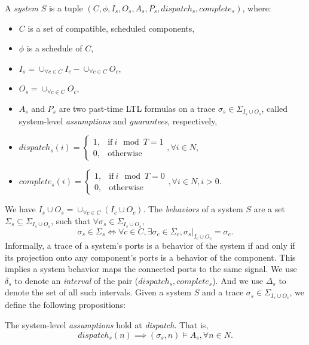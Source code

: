 A \emph{system} $S$ is a tuple $(C, \phi, I_s, O_s, A_s, P_s, dispatch_s, complete_s)$, where:
\begin{itemize}
	\item $C$ is a set of compatible, scheduled components,
	\item $\phi$ is a schedule of $C$,	
	\item $I_s = \cup_{\forall c \in C}I_c -  \cup_{\forall c \in C}O_c$,
	\item $O_s = \cup_{\forall c \in C}O_c$,
	\item $A_s$ and $P_s$ are two past-time LTL formulas on a trace $\sigma_s \in \Sigma_{I_s \cup O_s}$, called system-level \emph{assumptions} and \emph{guarantees}, respectively,
	\item $dispatch_s (i) = 
	    	\begin{cases}
      		1, & \text{if}\ i \mod T =1 \\
	     	0, & \text{otherwise}
   	 	\end{cases}, \forall i \in N$,
   	\item $complete_s (i) =
   		\begin{cases}
      		1, & \text{if}\ i \mod T = 0 \\
	     	0, & \text{otherwise}
   	 	\end{cases}, \forall i \in N, i > 0$.
\end{itemize}
We have $I_s  \cup O_s = \cup_{\forall c \in C}(I_c \cup O_c)$.
The \emph{behaviors} of a system $S$ are a set $\Sigma_s \subseteq \Sigma_{I_s \cup O_s}$, such that $\forall \sigma_s \in \Sigma_{I_s \cup O_s}$, 
\begin{equation}
	\sigma_s\in \Sigma_s  \iff \forall c \in C, \exists \sigma_c \in \Sigma_c, \sigma_s|_{I_c \cup O_c} = \sigma_c.
\end{equation}
Informally, a trace of a system's ports is a behavior of the system if and only if its projection onto any component's ports is a behavior of the component. 
This implies a system behavior maps the connected ports to the same signal.
We use $\delta_s$ to denote an \emph{interval} of the pair ($dispatch_s, complete_s$). And we use $\Delta_s$ to denote the set of all such intervals.
Given a system $S$ and a trace $\sigma_s \in \Sigma_{I_s \cup O_s}$, we define the following propositions:

\bigskip
The system-level \emph{assumptions} hold at \emph{dispatch}. That is,
\begin{equation} 
\label{eqn:sys_assumption}
	dispatch_s(n) \implies (\sigma_s, n) \models A_s, \forall n\in N.
\end{equation}

